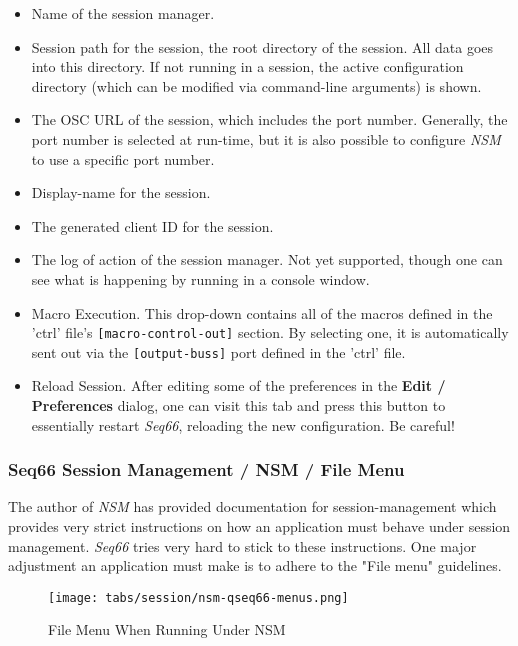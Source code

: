    \begin{itemize}
      \item Name of the session manager.
      \item Session path for the session, the root directory of the session.
         All data goes into this directory. If not running in a session,
         the active configuration directory (which can be modified via
         command-line arguments) is shown.
      \item The OSC URL of the session, which includes the port number.
         Generally, the port number is selected at run-time, but it is also
         possible to configure \textsl{NSM} to use a specific port number.
      \item Display-name for the session.
      \item The generated client ID for the session.
      \item The log of action of the session manager. Not yet supported,
         though one can see what is happening by running in a console window.
      \item Macro Execution.
         This drop-down contains all of the macros defined in the 'ctrl' file's
         \texttt{[macro-control-out]} section.
         By selecting one, it is automatically sent out via the
         \texttt{[output-buss]} port defined in the 'ctrl' file.
      \item Reload Session.
         After editing some of the preferences in the \textbf{Edit / Preferences}
         dialog, one can visit this tab and press this button to essentially
         restart \textsl{Seq66}, reloading the new configuration.
         Be careful!
   \end{itemize}

\subsubsection{Seq66 Session Management / NSM / File Menu}
\label{subsubsec:sessions_file_menu}

   The author of \textsl{NSM} has provided documentation for session-management
   which provides very strict instructions on how an application must behave
   under session management.  \textsl{Seq66} tries very hard to stick to these
   instructions.  One major adjustment an application must make is to adhere to
   the "File menu" guidelines.

\begin{figure}[H]
   \centering 
   \texttt{[image: tabs/session/nsm-qseq66-menus.png]}
   \caption*{File Menu When Running Under NSM}
\end{figure}


